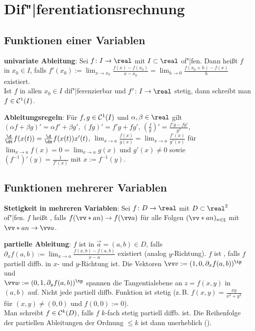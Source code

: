 \chapter{%
    Dif"|ferentiationsrechnung%
}

\section{%
    Funktionen einer Variablen%
}

\textbf{univariate Ableitung}:
Sei $f\colon I \to \real$ mit $I \subset \real$ of"|fen.
Dann heißt $f$  in $x_0 \in I$, falls
$f'(x_0) := \lim_{x \to x_0} \frac{f(x) - f(x_0)}{x - x_0} =
\lim_{h \to 0} \frac{f(x_0 + h) - f(x)}{h}$
existiert.\\
Ist $f$ in allen $x_0 \in I$ dif"|ferenzierbar und $f'\colon I \to \real$ stetig, dann schreibt
man $f \in \mathcal{C}^1(I)$.

\textbf{Ableitungsregeln}:
Für $f, g \in \mathcal{C}^1(I)$ und $\alpha, \beta \in \real$ gilt
$(\alpha f + \beta g)' = \alpha f' + \beta g'$,
$(fg)' = f'g + fg'$,
$(\frac{f}{g})' = \frac{f'g - fg'}{g^2}$,
$\frac{\d}{\dt} f(x(t)) = \frac{\d}{\dx} f(x(t)) x'(t)$,
$\lim_{x \to a} \frac{f(x)}{g(x)} = \lim_{x \to a} \frac{f'(x)}{g'(x)}$
für\\
$\lim_{x \to a} f(x) = 0 = \lim_{x \to a} g(x)$ und $g'(x) \not= 0$ sowie
$(f^{-1})'(y) = \frac{1}{f'(x)}$ mit $x := f^{-1}(y)$.

\section{%
    Funktionen mehrerer Variablen%
}

\textbf{Stetigkeit in mehreren Variablen}:
Sei $f\colon D \to \real$ mit $D \subset \real^2$ of"|fen.
$f$ heißt , falls $f(\vecs{a}{n}) \to f(\vec{a})$
für alle Folgen $(\vecs{a}{n})_{n \in \natural}$ mit $\vecs{a}{n} \to \vec{a}$.

\textbf{partielle Ableitung}:
$f$ ist  in
$\vec{a} = (a, b) \in D$, falls\\
$\partial_x f(a, b) := \lim_{x \to a} \frac{f(x, b) - f(a, b)}{x - a}$ existiert
(analog $y$-Richtung).
$f$ ist , falls $f$ partiell diffb.
in $x$- und $y$-Richtung ist.
Die Vektoren $\vec{v} := (1, 0, \partial_x f(a, b))^\tp$ und\\
$\vec{w} := (0, 1, \partial_y f(a, b))^\tp$ spannen die Tangentialebene an $z = f(x, y)$ in
$(a, b)$ auf.
Nicht jede partiell diffb. Funktion ist stetig
(z.\,B. $f(x, y) = \frac{xy}{x^2 + y^2}$ für $(x, y) \not= (0, 0)$ und $f(0, 0) := 0$).\\
Man schreibt $f \in \mathcal{C}^k(D)$, falls $f$ $k$-fach stetig partiell diffb. ist.
Die Reihenfolge der partiellen Ableitungen der Ordnung $\le k$ ist dann unerheblich
().


